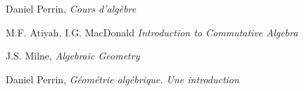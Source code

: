 \begin{thebibliography}{99}

  Daniel Perrin, \textit{Cours d'algèbre}

 M.F. Atiyah,
 I.G. MacDonald \textit{Introduction to Commutative Algebra}


  J.S. Milne, \textit{Algebraic Geometry}

    Daniel Perrin, \textit{Géométrie algébrique. Une introduction}

\end{thebibliography}